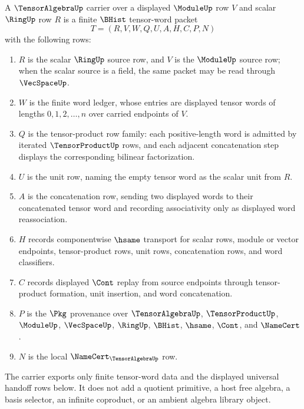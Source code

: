 \begin{definition}
\label{def:tensor-algebra-carrier}
A $\TensorAlgebraUp$ carrier over a displayed $\ModuleUp$ row $V$ and scalar $\RingUp$ row $R$ is a finite $\BHist$ tensor-word packet
$$
T=(R,V,W,Q,U,A,H,C,P,N)
$$
with the following rows:
\begin{enumerate}
\item $R$ is the scalar $\RingUp$ source row, and $V$ is the $\ModuleUp$ source row; when the scalar source is a field, the same packet may be read through $\VecSpaceUp$.
\item $W$ is the finite word ledger, whose entries are displayed tensor words of lengths $0,1,2,\ldots,n$ over carried endpoints of $V$.
\item $Q$ is the tensor-product row family: each positive-length word is admitted by iterated $\TensorProductUp$ rows, and each adjacent concatenation step displays the corresponding bilinear factorization.
\item $U$ is the unit row, naming the empty tensor word as the scalar unit from $R$.
\item $A$ is the concatenation row, sending two displayed words to their concatenated tensor word and recording associativity only as displayed word reassociation.
\item $H$ records componentwise $\hsame$ transport for scalar rows, module or vector endpoints, tensor-product rows, unit rows, concatenation rows, and word classifiers.
\item $C$ records displayed $\Cont$ replay from source endpoints through tensor-product formation, unit insertion, and word concatenation.
\item $P$ is the $\Pkg$ provenance over $\TensorAlgebraUp$, $\TensorProductUp$, $\ModuleUp$, $\VecSpaceUp$, $\RingUp$, $\BHist$, $\hsame$, $\Cont$, and $\NameCert$.
\item $N$ is the local $\NameCert_{\TensorAlgebraUp}$ row.
\end{enumerate}
The carrier exports only finite tensor-word data and the displayed universal handoff rows below. It does not add a quotient primitive, a host free algebra, a basis selector, an infinite coproduct, or an ambient algebra library object.
\end{definition}

